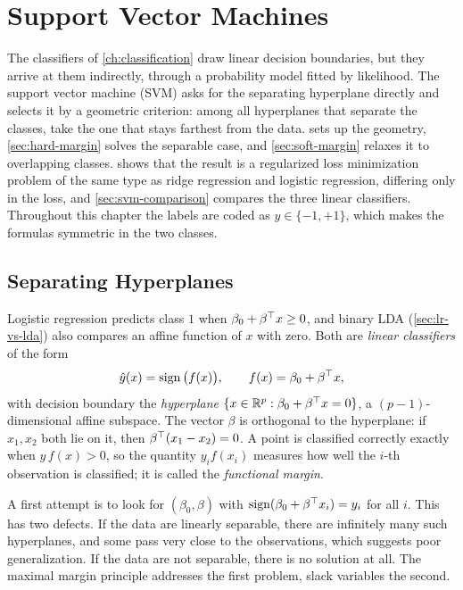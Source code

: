 \chapter{Support Vector Machines}\label{ch:svm}

The classifiers of \cref{ch:classification} draw linear decision boundaries, but they arrive at them indirectly, through a probability model fitted by likelihood. The support vector machine (SVM) asks for the separating hyperplane directly and selects it by a geometric criterion: among all hyperplanes that separate the classes, take the one that stays farthest from the data.  sets up the geometry, \cref{sec:hard-margin} solves the separable case, and \cref{sec:soft-margin} relaxes it to overlapping classes.  shows that the result is a regularized loss minimization problem of the same type as ridge regression and logistic regression, differing only in the loss, and \cref{sec:svm-comparison} compares the three linear classifiers. Throughout this chapter the labels are coded as $y\in\{-1,+1\}$, which makes the formulas symmetric in the two classes.

\section{Separating Hyperplanes}\label{sec:separating-hyperplanes}

Logistic regression predicts class $1$ when $\beta_0+\beta^{\top} x\ge0$, and binary LDA (\cref{sec:lr-vs-lda}) also compares an affine function of $x$ with zero. Both are \emph{linear classifiers} of the form
\[
\hat y(x)=\operatorname{sign}\big(f(x)\big),\qquad f(x)=\beta_0+\beta^{\top} x,
\]
with decision boundary the \emph{hyperplane} $\{x\in\mathbb{R}^p:\beta_0+\beta^{\top} x=0\}$, a $(p-1)$-dimensional affine subspace. The vector $\beta$ is orthogonal to the hyperplane: if $x_1,x_2$ both lie on it, then $\beta^{\top}(x_1-x_2)=0$. A point is classified correctly exactly when $y\,f(x)>0$, so the quantity $y_if(x_i)$ measures how well the $i$-th observation is classified; it is called the \emph{functional margin}.

A first attempt is to look for $(\beta_0,\beta)$ with $\operatorname{sign}(\beta_0+\beta^{\top} x_i)=y_i$ for all $i$. This has two defects. If the data are linearly separable, there are infinitely many such hyperplanes, and some pass very close to the observations, which suggests poor generalization. If the data are not separable, there is no solution at all. The maximal margin principle addresses the first problem, slack variables the second.

